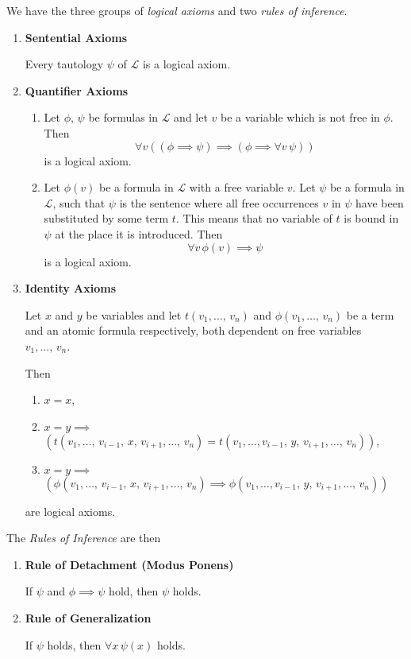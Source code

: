 \documentclass[../../main.tex]{subfiles}
\begin{document}
\begin{definition}
    We have the three groups of \textit{logical axioms} and two \textit{rules of inference}.
    \begin{enumerate}
        \item \textbf{Sentential Axioms}
        
        Every tautology $\psi$ of $\mathcal{L}$ is a logical axiom. %
        \item \textbf{Quantifier Axioms}
        \begin{enumerate}
            \item Let $\phi,\, \psi$ be formulas in $\mathcal{L}$ and let $v$ be a variable which is not free in $\phi$.
            Then
            $$\forall v \left((\phi \implies \psi) \implies (\phi \implies \forall v\, \psi)\right)$$
            is a logical axiom.
            \item Let $\phi(v)$ be a formula in $\mathcal{L}$ with a free variable $v$.
            Let $\psi$ be a formula in $\mathcal{L}$, 
            such that $\psi$ is the sentence where all free occurrences $v$ in $\psi$ have been substituted by some term $t$.
            This means that no variable of $t$ is bound in $\psi$ at the place it is introduced.
            Then 
            $$\forall v \, \phi(v) \implies \psi$$
            is a logical axiom.
        \end{enumerate}
        \item \textbf{Identity Axioms}
        
        Let $x$ and $y$ be variables and let $t(v_1,\ldots,\, v_n)$ and $\phi(v_1,\ldots,\, v_n)$ be a term and an atomic formula respectively,
        both dependent on free variables $v_1,\ldots,\, v_n$.

        Then 
        \begin{enumerate}
            \item $x = x$,
            \item $x = y \implies$ \newline
            $\left(t(v_1,\ldots,\, v_{i-1},\, x,\, v_{i+1},\ldots,\, v_n) = t(v_1,\ldots,v_{i-1},\, y,\, v_{i+1},\ldots,\, v_n)\right)$,
            \item $x = y \implies$ \newline
            $\left(\phi(v_1,\ldots,\, v_{i-1},\, x,\, v_{i+1},\ldots,\, v_n) \implies \phi(v_1,\ldots,v_{i-1},\, y,\, v_{i+1},\ldots,\, v_n)\right)$
        \end{enumerate}
        are logical axioms.
    \end{enumerate}
    The \textit{Rules of Inference} are then
    \begin{enumerate}[resume]
        \item \textbf{Rule of Detachment (Modus Ponens)}
        
        If $\psi$ and $\phi \implies \psi$ hold, then $\psi$ holds.
        \item \textbf{Rule of Generalization}
        
        If $\psi$ holds, then $\forall x\, \psi(x)$ holds.
    \end{enumerate}
\end{definition}
\end{document}
